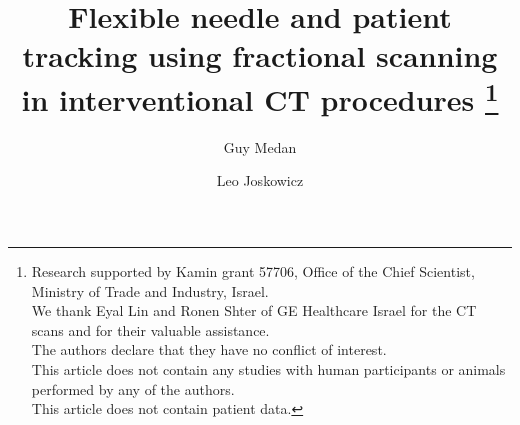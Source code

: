 \title{Flexible needle and patient tracking using fractional scanning in interventional CT procedures
\thanks{Research supported by Kamin grant 57706, Office of the Chief Scientist, Ministry of Trade and Industry, Israel.\\
We thank Eyal Lin and Ronen Shter of GE Healthcare Israel for the CT scans and for their valuable assistance.\\
The authors declare that they have no conflict of interest.\\
This article does not contain any studies with human participants or animals performed by any of the authors.\\
This article does not contain patient data.}%
}


\author{Guy Medan         \and
        Leo Joskowicz %
}



\date{}

